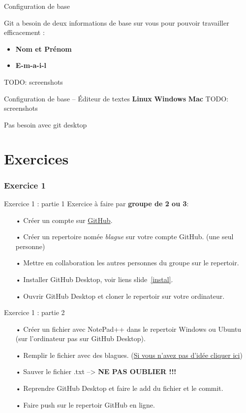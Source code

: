 \documentclass{beamer}
\begin{document}
\begin{frame}{Configuration de base}

Git a besoin de deux informations de base sur vous pour pouvoir travailler
efficacement :

\begin{itemize}
\item \textbf{Nom et Prénom}
\item \textbf{E-m-a-i-l}
\end{itemize}
TODO: screenshots

\end{frame}

\begin{frame}{Configuration de base -- Éditeur de textes}
    \textbf{Linux}
    \textbf{Windows}
    \textbf{Mac}
    TODO: screenshots
    
    Pas besoin avec git desktop
\end{frame}


\section{Exercices}
\subsubsection{Exercice 1}
\begin{frame}{Exercice 1 : partie 1}
Exercice à faire par \textbf{groupe de 2 ou 3}:
    \begin{itemize}
    \item[•] Créer un compte sur \href{https://github.com}{GitHub}.
    \item[•] Créer un repertoire nomée \textit{blague} sur votre compte GitHub. (une seul personne)
    \item[•] Mettre en collaboration les autres personnes du groupe sur le repertoir. 
    \item[•] Installer GitHub Desktop, voir liens slide~\ref{instal}.
    \item[•] Ouvrir GitHub Desktop et cloner le repertoir sur votre ordinateur.
    \end{itemize}
\end{frame}

\begin{frame}{Exercice 1 : partie 2}
    \begin{itemize}
    \item[•] Créer un fichier avec NotePad++ dans le repertoir Windows ou Ubuntu (sur l'ordinateur pas sur GitHub Desktop).
    \item[•] Remplir le fichier avec des blagues. (\href{https://linuxfr.org/news/blagues-d-informaticiens}{Si vous n'avez pas d'idée cliquer ici})
    \item[•] Sauver le fichier .txt --> \textbf{NE PAS OUBLIER !!!}
    \item[•] Reprendre GitHub Desktop et faire le add du fichier et le commit.
    \item[•] Faire push sur le repertoir GitHub en ligne.
    \end{itemize}
\end{frame}
\end{document}
